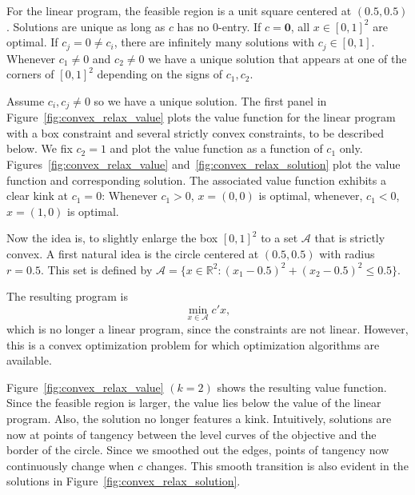 \documentclass[12pt,a4paper,english]{article} %
\numberwithin{equation}{section}
\theoremstyle{definition}
\theoremstyle{remark}
\theoremstyle{plain}
\begin{document}
For the linear program, the feasible region is a unit square centered at $(0.5, 0.5)$. Solutions are unique as long as $c$ has no $0$-entry.
If $c=\mathbf{0}$, all $x\in [0,1]^2$ are optimal. If $c_j = 0 \neq c_i$, there are infinitely many solutions with $c_j \in [0,1]$.
Whenever $c_1\neq0$ and $c_2\neq0$ we have a unique solution that appears at one of the corners of $[0,1]^2$ depending on the signs of $c_1, c_2$.

Assume $c_i, c_j \neq 0$ so we have a unique solution.
The first panel in Figure~\ref{fig:convex_relax_value} plots the value function for the linear program with a box constraint and several strictly convex constraints, to be described below.
We fix $c_2 = 1$ and plot the value function as a function of $c_1$ only.
Figures~\ref{fig:convex_relax_value} and~\ref{fig:convex_relax_solution} plot the value function and corresponding solution.
The associated value function exhibits a clear kink at $c_1 = 0$: Whenever $c_1 > 0$, $x = (0, 0)$ is optimal, whenever, $c_1 < 0$, $x=(1,0)$ is optimal.

Now the idea is, to slightly enlarge the box $[0,1]^2$ to a set $\mathcal{A}$ that is strictly convex.
A first natural idea is the circle centered at $(0.5, 0.5)$ with radius $r=0.5$.
This set is defined by $\mathcal{A} = \{x \in \mathbb{R}^2: (x_1 - 0.5)^2 + (x_2 - 0.5)^2 \leq 0.5\}$.

The resulting program is
\begin{equation}
	\min_{x\in\mathcal{A}} c'x,
\end{equation}
which is no longer a linear program, since the constraints are not linear.
However, this is a convex optimization problem for which optimization algorithms are available.

Figure~\ref{fig:convex_relax_value} $(k=2)$ shows the resulting value function.
Since the feasible region is larger, the value lies below the value of the linear program.
Also, the solution no longer features a kink.
Intuitively, solutions are now at points of tangency between the level curves of the objective and the border of the circle.
Since we smoothed out the edges, points of tangency now continuously change when $c$ changes.
This smooth transition is also evident in the solutions in Figure~\ref{fig:convex_relax_solution}.
\end{document}
